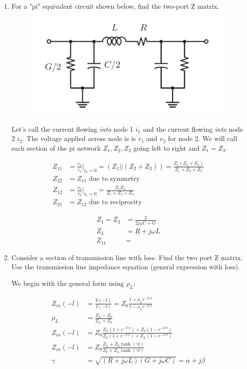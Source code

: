 \documentclass[11pt]{article}
\begin{document}
\begin{enumerate}
	\item For a "pi" equivalent circuit shown below, find the two-port Z matrix.
	\begin{figure}[H]
		\centering \includegraphics[width=\textwidth-6cm]{images/problem2_pi_network.png}
	\end{figure}

	Let's call the current flowing \emph{into} node 1 $i_1$ and the current flowing \emph{into} node 2 $i_2$. The voltage applied across node is is $v_1$ and $v_2$ for node 2. We will call each section of the pi network $Z_1, Z_2, Z_3$ going left to right and $Z_1 = Z_3$.
	
	\begin{align*}
		Z_{11} &= \frac{v_1}{i_1} \bigg\rvert_{i_2 = 0} = (Z_1 || (Z_2 + Z_3)) = \frac{Z_1(Z_2 + Z_3)}{Z_1 + Z_2 + Z_3} \\
		Z_{22} &= Z_{11} \text{ due to symmetry} \\
		Z_{12} &= \frac{v_1}{i_2} \bigg\rvert_{i_1 = 0} = \frac{Z_1 Z_3}{Z_1 + Z_2 + Z_3} \\
		Z_{21} &= Z_{12} \text{ due to reciprocity}
	\end{align*}
	
	\begin{align*}
		Z_1 = Z_3 &= \frac{2}{2j \omega C + G} \\
		Z_2 &= R + j \omega L \\
		Z_{11} &= 
	\end{align*}
	
	\item Consider a section of transmission line with loss. Find the two port Z matrix. Use the transmission line impedance equation (general expression with loss).
	
	We begin with the general form using $\rho_L$:
	
	\begin{align*}
		Z_{in}(-l) &= \frac{V(-l)}{I(-l)} = Z_0 \frac{1 + \rho_L e^{-2 \gamma l}}{1 - \rho_L e^{-2 \gamma l}} \\
		\rho_L &= \frac{Z_L - Z_0}{Z_L + Z_0} \\
		Z_{in}(-l) &= Z_0 \frac{Z_L(1 + e^{-2 \gamma l}) + Z_0(1 - e^{-2 \gamma l})}{Z_0(1 + e^{-2 \gamma l}) + Z_L(1 - e^{-2 \gamma l})} \\
		Z_{in}(-l) &= Z_0 \frac{Z_L + Z_0 \tanh(\gamma l)}{Z_0 + Z_L \tanh(\gamma l)} \\
		\gamma &= \sqrt{(R + j \omega L)(G + j \omega C)} = \alpha + j \beta
	\end{align*}
	

\end{enumerate}
\end{document}
